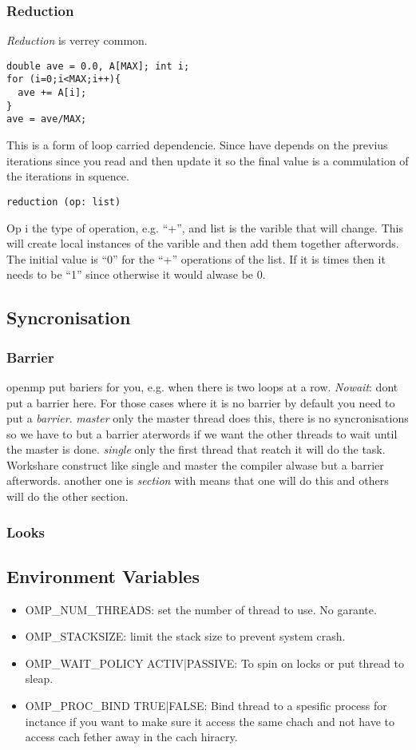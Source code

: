 \subsubsection{Reduction}
\textit{Reduction} is verrey common.
\begin{BVerbatim}[baseline=c]
double ave = 0.0, A[MAX]; int i;
for (i=0;i<MAX;i++){
  ave += A[i];
}
ave = ave/MAX;
\end{BVerbatim}
This is a form of loop carried dependencie. Since have depends on the previus iterations
since you read and then update it so the final value is a commulation of the iterations in squence.


\begin{BVerbatim}[baseline=c]
  reduction (op: list)
\end{BVerbatim}
Op i the type of operation, e.g. ``+'', and list is the varible that will change.
This will create local instances of the varible and then add them together afterwords.
The initial value is ``0'' for the ``+'' operations of the list. If it is times then it needs to be ``1'' since otherwise it would alwase be 0.

\subsection{Syncronisation}
\subsubsection{Barrier}
openmp put bariers for you, e.g. when there is two loops at a row.
\textit{Nowait}: dont put a barrier here.
For those cases where it is no barrier by default you need to put a \textit{barrier}.
\textit{master} only the master thread does this, there is no syncronisations so we have to but a barrier aterwords if we want the other threads to wait until the master is done.
\textit{single} only the first thread that reatch it will do the task.
Workshare construct like single and master the compiler alwase but a barrier afterwords.
another one is \textit{section} with means that one will do this and others will do the other section.

\subsubsection{Looks}

\subsection{Environment Variables}
\begin{itemize}
  \item OMP\_NUM\_THREADS: set the number of thread to use. No garante.
  \item OMP\_STACKSIZE: limit the stack size to prevent system crash.
  \item OMP\_WAIT\_POLICY ACTIV|PASSIVE: To spin on locks or put thread to sleap.
  \item OMP\_PROC\_BIND TRUE|FALSE: Bind thread to a spesific process for inctance if you want to make sure it access the same chach and not have to access cach fether away in the cach hiracry.
\end{itemize}
  
